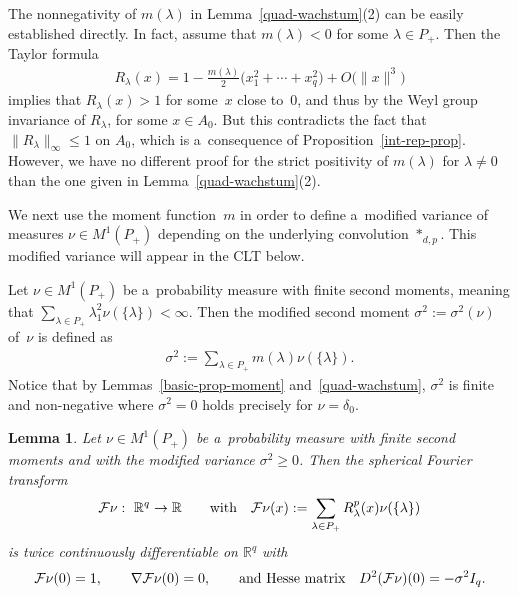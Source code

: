 \documentclass[11pt]{article}
\numberwithin{equation}{section}
\newtheorem{Lemma}[Theorem]{Lemma}
\begin{document}
\begin{Remark}
The nonnegativity of $m(\lambda)$ in Lemma~\ref{quad-wachstum}(2) can be easily established directly.
In fact, assume that $m(\lambda)<0$ for some $\lambda\in P_+$.
Then the Taylor formula
\begin{gather*}
R_\lambda(x)=1-\frac{m(\lambda)}{2}\big(x_1^2+\cdots+x_q^2\big)+O\big(\|x\|^3\big)
\end{gather*}
implies that $R_\lambda(x)>1$ for some~$x$ close to~$0$, and thus by the Weyl group invariance of $R_\lambda$, for some
$x\in A_0$.
But this contradicts the fact that $\|R_\lambda\|_\infty\le1$ on $A_0$, which is a~consequence of
Proposition~\ref{int-rep-prop}.
However, we have no dif\/ferent proof for the strict positivity of $m(\lambda)$ for $\lambda\ne 0$ than the one given in
Lemma~\ref{quad-wachstum}(2).
\end{Remark}

We next use the moment function~$m$ in order to def\/ine a~modif\/ied variance of measures $\nu\in M^1(P_+)$ depending on
the underlying convolution $*_{d,p}$.
This modif\/ied variance will appear in the CLT below.

\begin{Definition}
Let $\nu\in M^1(P_+)$ be a~probability measure with f\/inite second moments, meaning that $\sum\limits_{\lambda\in P_+}
\lambda_1^2 \nu(\{\lambda\})<\infty$. Then the modif\/ied second moment $\sigma^2:=\sigma^2(\nu)$ of~$\nu$ is def\/ined as
\begin{gather*}
\sigma^2:=\sum\limits_{\lambda\in P_+} m(\lambda) \nu(\{\lambda\}).
\end{gather*}
Notice that by Lemmas~\ref{basic-prop-moment} and~\ref{quad-wachstum}, $\sigma^2$ is f\/inite and non-negative where
$\sigma^2=0$ holds precisely for $\nu=\delta_0$.
\end{Definition}

\begin{Lemma}
\label{diffbar}
Let $\nu\in M^1(P_+)$ be a~probability measure with finite second moments and with the modified variance $\sigma^2\ge0$.
Then the spherical Fourier transform
\begin{gather*}
{\cal F}\nu: \ \mathbb R^q\to\mathbb R
\qquad
\text{with}
\quad
{\cal F}\nu(x):=\sum\limits_{\lambda\in P_+} R_\lambda^p(x) \nu(\{\lambda\})
\end{gather*}
is twice continuously differentiable on $\mathbb R^q$ with
\begin{gather*}
{\cal F}\nu(0)=1,
\qquad
\nabla{\cal F}\nu(0)=0,
\qquad
\text{and Hesse matrix}
\quad
D^2({\cal F}\nu)(0)=-\sigma^2  I_q.
\end{gather*}
\end{Lemma}
\end{document}
